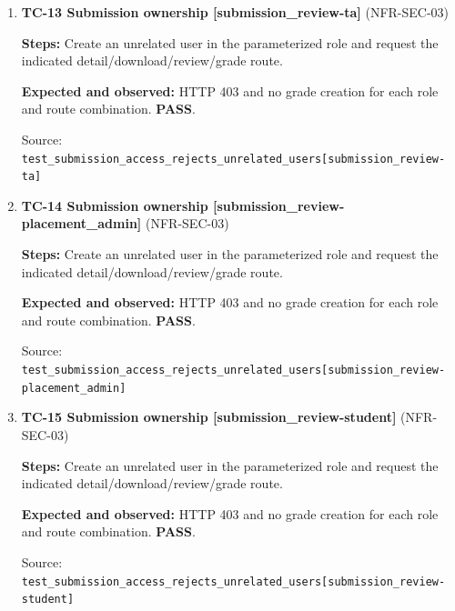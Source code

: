 \begin{enumerate}
\item \begin{minipage}[t]{\linewidth}\textbf{TC-13 Submission ownership [submission\_review-ta]} (NFR-SEC-03)\par

\textbf{Steps:} Create an unrelated user in the parameterized role and request the indicated detail/download/review/grade route.\par

\textbf{Expected and observed:} HTTP 403 and no grade creation for each role and route combination. \textbf{PASS}.\par

{\footnotesize Source: \nolinkurl{test_submission_access_rejects_unrelated_users[submission_review-ta]}}\end{minipage}

\item \begin{minipage}[t]{\linewidth}\textbf{TC-14 Submission ownership [submission\_review-placement\_admin]} (NFR-SEC-03)\par

\textbf{Steps:} Create an unrelated user in the parameterized role and request the indicated detail/download/review/grade route.\par

\textbf{Expected and observed:} HTTP 403 and no grade creation for each role and route combination. \textbf{PASS}.\par

{\footnotesize Source: \nolinkurl{test_submission_access_rejects_unrelated_users[submission_review-placement_admin]}}\end{minipage}

\item \begin{minipage}[t]{\linewidth}\textbf{TC-15 Submission ownership [submission\_review-student]} (NFR-SEC-03)\par

\textbf{Steps:} Create an unrelated user in the parameterized role and request the indicated detail/download/review/grade route.\par

\textbf{Expected and observed:} HTTP 403 and no grade creation for each role and route combination. \textbf{PASS}.\par

{\footnotesize Source: \nolinkurl{test_submission_access_rejects_unrelated_users[submission_review-student]}}\end{minipage}


\end{enumerate}
